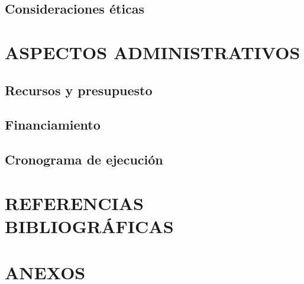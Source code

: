 \documentclass{report}
\begin{document}
\subsection{Consideraciones éticas}

\section{ASPECTOS ADMINISTRATIVOS}
\subsection{Recursos y presupuesto}
\subsection{Financiamiento}
\subsection{Cronograma de ejecución}

\section{REFERENCIAS BIBLIOGRÁFICAS}
\section{ANEXOS}
\end{document}
